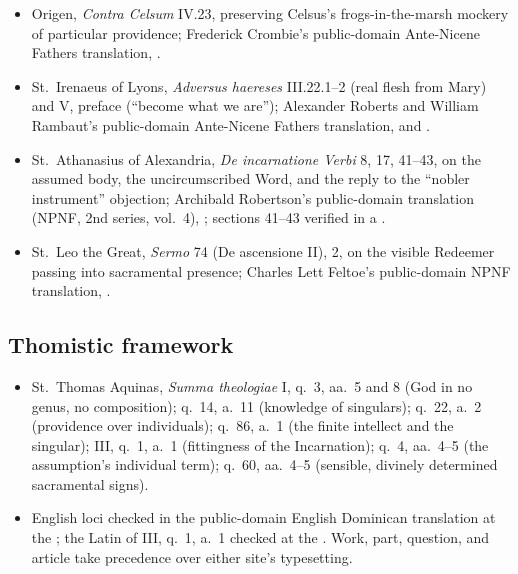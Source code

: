 {\fontsize{8.6}{9.6}\selectfont
\begin{itemize}[itemsep=0pt,parsep=0pt,topsep=0.05em]
\item Origen, \emph{Contra Celsum} IV.23, preserving Celsus's frogs-in-the-marsh mockery of particular providence; Frederick Crombie's public-domain Ante-Nicene Fathers translation, .
\item St.~Irenaeus of Lyons, \emph{Adversus haereses} III.22.1--2 (real flesh from Mary) and V, preface (``become what we are''); Alexander Roberts and William Rambaut's public-domain Ante-Nicene Fathers translation,  and .
\item St.~Athanasius of Alexandria, \emph{De incarnatione Verbi} 8, 17, 41--43, on the assumed body, the uncircumscribed Word, and the reply to the ``nobler instrument'' objection; Archibald Robertson's public-domain translation (NPNF, 2nd series, vol.~4), ; sections 41--43 verified in a .
\item St.~Leo the Great, \emph{Sermo} 74 (De ascensione II), 2, on the visible Redeemer passing into sacramental presence; Charles Lett Feltoe's public-domain NPNF translation, .
\end{itemize}}

\subsection*{Thomistic framework}

{\fontsize{8.6}{9.6}\selectfont
\begin{itemize}[itemsep=0pt,parsep=0pt,topsep=0.05em]
\item St.~Thomas Aquinas, \emph{Summa theologiae} I, q.~3, aa.~5 and 8 (God in no genus, no composition); q.~14, a.~11 (knowledge of singulars); q.~22, a.~2 (providence over individuals); q.~86, a.~1 (the finite intellect and the singular); III, q.~1, a.~1 (fittingness of the Incarnation); q.~4, aa.~4--5 (the assumption's individual term); q.~60, aa.~4--5 (sensible, divinely determined sacramental signs).
\item English loci checked in the public-domain English Dominican translation at the ; the Latin of III, q.~1, a.~1 checked at the . Work, part, question, and article take precedence over either site's typesetting.
\end{itemize}}

